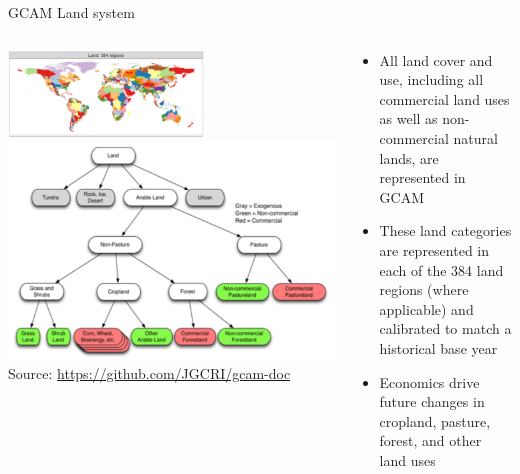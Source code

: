 \begin{frame}{GCAM Land system}
    \begin{columns}[T] 
        \begin{column}{0.54\textwidth} 
            \centering
            \includegraphics[width=0.6\textwidth]{extraFigs/GCAM_land_system_breakout.png}
            \includegraphics[width=\textwidth]{extraFigs/GCAM_land_system.png}
            \vfill\hfill \tiny{Source: \url{https://github.com/JGCRI/gcam-doc}}
        \end{column}
        \begin{column}{0.45\textwidth}
            \begin{itemize}
                \item All land cover and use, including all commercial land uses as well as non-commercial natural lands, are represented in GCAM
                \item These land categories are represented in each of the 384 land regions (where applicable) and calibrated to match a historical base year
                \item Economics drive future changes in cropland, pasture, forest, and other land uses
            \end{itemize}
        \end{column}
    \end{columns}
\end{frame}
    
